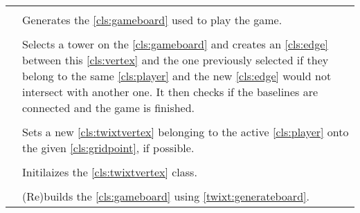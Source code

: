 \paragraph*{}
\begin{longtable}{Lp{10cm}}
	\startmethodtable
	 \\
	& Generates the \ref{cls:gameboard} used to play the game. \\
	 \\
	& Selects a tower on the \ref{cls:gameboard} and creates an \ref{cls:edge} between this \ref{cls:vertex} and the one previously selected if they belong to the same \ref{cls:player} and the new \ref{cls:edge} would not intersect with another one.
	It then checks if the baselines are connected and the game is finished.\\
	 \\
	& Sets a new \ref{cls:twixtvertex} belonging to the active \ref{cls:player} onto the given \ref{cls:gridpoint}, if possible. \\
	 \\
	& Initilaizes the \ref{cls:twixtvertex} class. \\
	 \\
	& (Re)builds the \ref{cls:gameboard} using \ref{twixt:generateboard}. \\	
	\hline
\end{longtable}
